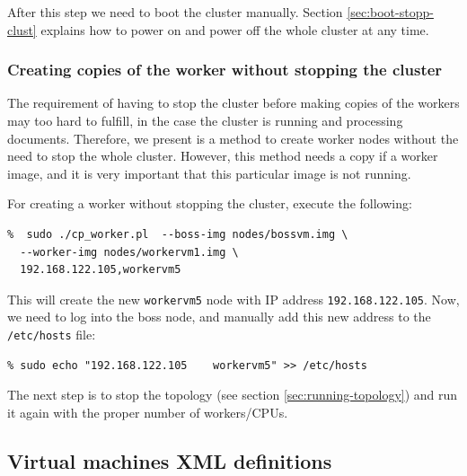 \documentclass[a4]{article}
\begin{document}
After this step we need to boot the cluster manually. Section
\ref{sec:boot-stopp-clust} explains how to power on and power off the whole
cluster at any time.

\subsubsection*{Creating copies of the worker without stopping the cluster}
\label{sec:creat-copi-work}

The requirement of having to stop the cluster before making copies of the
workers may too hard to fulfill, in the case the cluster is running and
processing documents. Therefore, we present is a method to create worker
nodes without the need to stop the whole cluster. However, this method needs
a copy if a worker image, and it is very important that this particular
image is not running.

For creating a worker without stopping the cluster, execute the following:

\begin{verbatim}
%  sudo ./cp_worker.pl  --boss-img nodes/bossvm.img \
  --worker-img nodes/workervm1.img \
  192.168.122.105,workervm5
\end{verbatim}

This will create the new \texttt{workervm5} node with IP address
\texttt{192.168.122.105}. Now, we need to log into the boss node, and
manually add this new address to the \texttt{/etc/hosts} file:

\begin{verbatim}
% sudo echo "192.168.122.105	workervm5" >> /etc/hosts
\end{verbatim}

The next step is to stop the topology (see section
\ref{sec:running-topology}) and run it again with the proper number of
workers/CPUs.

\subsection{Virtual machines XML definitions}
\label{sec:virtual-machines-xml}
\end{document}

